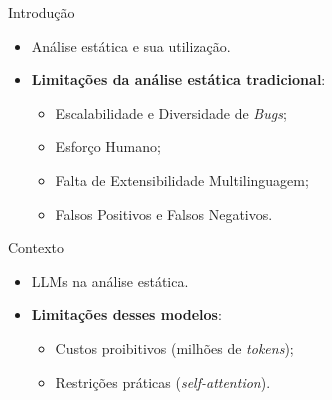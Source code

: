 \documentclass[
    aspectratio=169,   %
    12pt,
    brazil
]{beamer}
\newcommand{\minhaspaginas}{}
\begin{document}
\renewcommand{\minhaspaginas}{\small 8 - 9}
\begin{frame}{Introdução}
  \begin{itemize}
    \item Análise estática e sua utilização.
    \item \textbf{Limitações da análise estática tradicional}:
      \begin{itemize}
        \item Escalabilidade e Diversidade de \textit{Bugs};
        \item Esforço Humano;
        \item Falta de Extensibilidade Multilinguagem;
        \item Falsos Positivos e Falsos Negativos.
      \end{itemize}
  \end{itemize}
\end{frame}

\renewcommand{\minhaspaginas}{\small 9 - 11}
\begin{frame}{Contexto}
  \begin{itemize}
    \item LLMs na análise estática.
    \item \textbf{Limitações desses modelos}:
    \begin{itemize}
      \item Custos proibitivos (milhões de \textit{tokens});
      \item Restrições práticas (\textit{self-attention}).
    \end{itemize}
  \end{itemize}
\end{frame}
\end{document}
